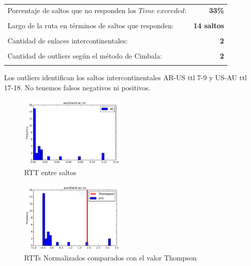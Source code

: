 \begin{center}
\begin{tabular}{p{6.5cm}r}
Porcentaje de saltos que no responden los $Time$ $exceeded$: & \textbf{33\%} \\ \\ 
Largo de la ruta en términos de saltos que responden: &\textbf{14 saltos} \\ \\
Cantidad de enlaces intercontinentales: & \textbf{2} \\ \\
Cantidad de outliers según el método de Cimbala: & \textbf{2} \\ \\
\end{tabular}
\end{center}

Los outliers identifican los saltos intercontinentales AR-US ttl 7-9 y US-AU ttl 17-18. No tenemos falsos negativos ni positivos.

\begin{figure}[H]
  \centering
    \includegraphics[width=0.45\textwidth]{histogramas_rtt/auckland-ac-nz.png}
  \caption{RTT entre saltos}
  \label{entropia-s}
\end{figure}

\begin{center}

\end{center}

\begin{figure}[H]
  \centering
    \includegraphics[width=0.45\textwidth]{histogramas_thompson/auckland-ac-nz.png}
  \caption{RTTs Normalizados comparados con el valor Thompson}
  \label{entropia-s}
\end{figure}


